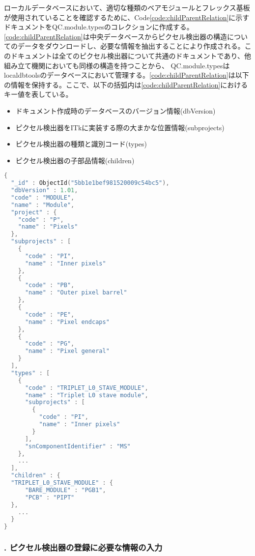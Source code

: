 ローカルデータベースにおいて、適切な種類のベアモジュールとフレックス基板が使用されていることを確認するために、Code\ref{code:childParentRelation}に示すドキュメントをQC.module.typesのコレクションに作成する。\cref{code:childParentRelation}は中央データベースからピクセル検出器の構造についてのデータをダウンロードし、必要な情報を抽出することにより作成される。このドキュメントは全てのピクセル検出器について共通のドキュメントであり、他組み立て機関においても同様の構造を持つことから、 QC.module.typesはlocaldbtoolsのデータベースにおいて管理する。\cref{code:childParentRelation}は以下の情報を保持する。ここで、以下の括弧内は\cref{code:childParentRelation}におけるキー値を表している。
\begin{itemize}
  \item ドキュメント作成時のデータベースのバージョン情報(dbVersion)
  \item ピクセル検出器をITkに実装する際の大まかな位置情報(subprojects)
  \item ピクセル検出器の種類と識別コード(types)
  \item ピクセル検出器の子部品情報(children)
\end{itemize}

\begin{lstlisting}[caption=ピクセル検出器の組み立て工程を管理するためのドキュメントの一部。,label=code:childParentRelation, language=C++]
{
  "_id" : ObjectId("5bb1e1bef981520009c54bc5"),
  "dbVersion" : 1.01,
  "code" : "MODULE",
  "name" : "Module",
  "project" : {
    "code" : "P",
    "name" : "Pixels"
  },
  "subprojects" : [
    {
      "code" : "PI",
      "name" : "Inner pixels"
    },
    {
      "code" : "PB",
      "name" : "Outer pixel barrel"
    },
    {
      "code" : "PE",
      "name" : "Pixel endcaps"
    },
    {
      "code" : "PG",
      "name" : "Pixel general"
    }
  ],
  "types" : [
    {
      "code" : "TRIPLET_L0_STAVE_MODULE",
      "name" : "Triplet L0 stave module",
      "subprojects" : [
        {
          "code" : "PI",
          "name" : "Inner pixels"
        }
      ],
      "snComponentIdentifier" : "MS"
    },
    ...
  ],
  "children" : {
  "TRIPLET_L0_STAVE_MODULE" : {
	  "BARE_MODULE" : "PGB1",
	  "PCB" : "PIPT"
  },
    ...
  }
}
\end{lstlisting}

\subsubsection{. ピクセル検出器の登録に必要な情報の入力}

